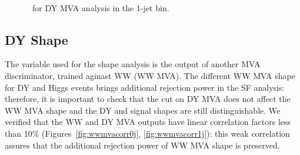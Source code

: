 \begin{figure}[!hbtp]
\begin{center}
\\
\caption{\routin\ for DY MVA analysis in the 1-jet bin.}
\label{fig:routin1j}
\end{center}
\end{figure}

\subsection{DY Shape}

The variable used for the shape analysis is the output of another MVA discriminator, trained aginast WW (WW MVA). 
The different WW MVA shape for DY and Higgs events brings additional rejection power in the SF analysis: 
therefore, it is important to check that the cut on DY MVA does not affect the WW MVA shape and the DY and signal shapes are still distinguishable. 
We verified that the WW and DY MVA outputs have linear correlation factors less than 10\% (Figures~\ref{fig:wwmvacorr0j}, \ref{fig:wwmvacorr1j}): this weak correlation
assures that the additional rejection power of WW MVA shape is preserved.

